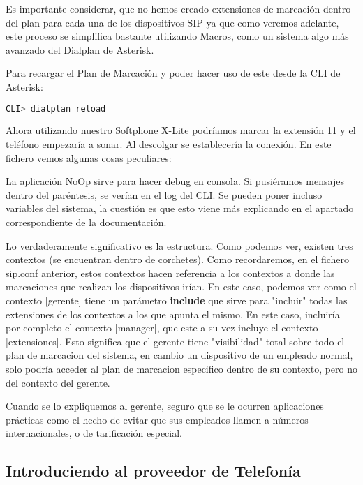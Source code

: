 

Es importante considerar, que no hemos creado extensiones de marcación dentro del plan para cada una de los dispositivos SIP ya que como veremos adelante, este proceso se simplifica bastante utilizando Macros, como un sistema algo más avanzado del Dialplan de Asterisk.

Para recargar el Plan de Marcación y poder hacer uso de este desde la CLI de Asterisk:

\begin{lstlisting}[language=sh]
CLI> dialplan reload
\end{lstlisting}

Ahora utilizando nuestro Softphone X-Lite podríamos marcar la extensión 11 y el teléfono empezaría a sonar. Al descolgar se establecería la conexión. En este fichero vemos algunas cosas peculiares:

La aplicación NoOp sirve para hacer debug en consola. Si pusiéramos mensajes dentro del paréntesis, se verían en el log del CLI. Se pueden poner incluso variables del sistema, la cuestión es que esto viene más explicando en el apartado correspondiente de la documentación.

Lo verdaderamente significativo es la estructura. Como podemos ver, existen tres contextos (se encuentran dentro de corchetes). Como recordaremos, en el fichero sip.conf anterior, estos contextos hacen referencia a los contextos a donde las marcaciones que realizan los dispositivos irían. En este caso, podemos ver como el contexto [gerente] tiene un parámetro \textbf{include} que sirve para "incluir" todas las extensiones de los contextos a los que apunta el mismo. En este caso, incluiría por completo el contexto [manager], que este a su vez incluye el contexto [extensiones]. Esto significa que el gerente tiene "visibilidad" total sobre todo el plan de marcacion del sistema, en cambio un dispositivo de un empleado normal, solo podría acceder al plan de marcacion especifico dentro de su contexto, pero no del contexto del gerente.

Cuando se lo expliquemos al gerente, seguro que se le ocurren aplicaciones prácticas como el hecho de evitar que sus empleados llamen a números internacionales, o de tarificación especial.

\newpage

\subsection{Introduciendo al proveedor de Telefonía}

